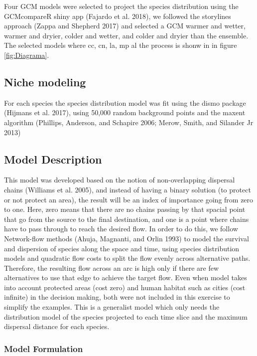 \documentclass[]{article}
\begin{document}
Four GCM models were selected to project the species distribution using the GCMcompareR shiny app (Fajardo et al. 2018), we followed the storylines approach (Zappa and Shepherd 2017) and selected a GCM warmer and wetter, warmer and dryier, colder and wetter, and colder and dryier than the ensemble. The selected models where cc, cn, la, mp al the process is shonw in in figure \ref{fig:Diagrama}.

\hypertarget{niche-modeling}{%
\subsection{Niche modeling}\label{niche-modeling}}

For each species the species distribution model was fit using the dismo package (Hijmans et al. 2017), using 50,000 random background points and the maxent algorithm (Phillips, Anderson, and Schapire 2006; Merow, Smith, and Silander Jr 2013)

\hypertarget{model-description}{%
\subsection{Model Description}\label{model-description}}

This model was developed based on the notion of non-overlapping dispersal chains (Williams et al. 2005), and instead of having a binary solution (to protect or not protect an area), the result will be an index of importance going from zero to one. Here, zero means that there are no chains passing by that spacial point that go from the source to the final destination, and one is a point where chains have to pass through to reach the desired flow.
In order to do this, we follow Network-flow methods (Ahuja, Magnanti, and Orlin 1993) to model the survival and dispersion of species along the space and time, using species distribution models and quadratic flow costs to split the flow evenly across alternative paths. Therefore, the resulting flow across an arc is high only if there are few alternatives to use that edge to achieve the target flow.
Even when model takes into account protected areas (cost zero) and human habitat such as cities (cost infinite) in the decision making, both were not included in this exercise to simplify the examples. This is a generalist model which only needs the distribution model of the species projected to each time slice and the maximum dispersal distance for each species.

\hypertarget{model-formulation}{%
\subsubsection{Model Formulation}\label{model-formulation}}
\end{document}
